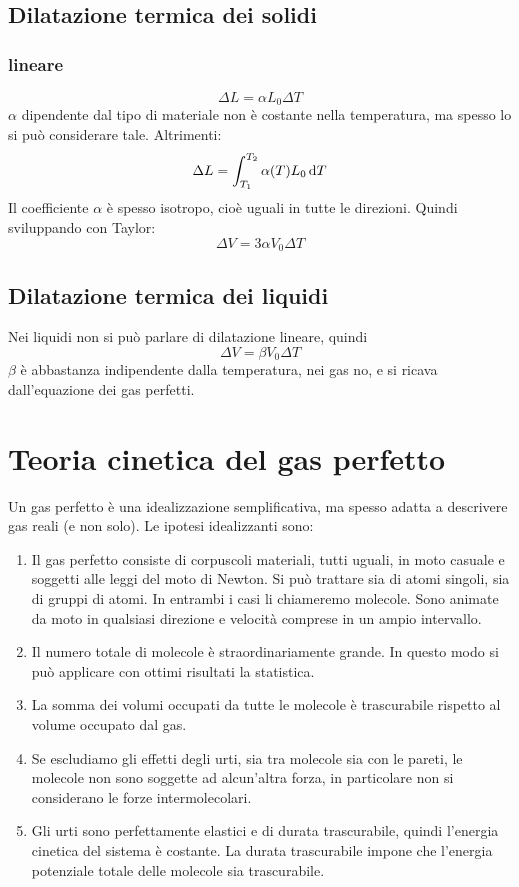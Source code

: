 \subsection{Dilatazione termica dei solidi}
\subsubsection{lineare}
\begin{equation}
\Delta L=\alpha L_0\Delta T
\end{equation}
$\alpha$ dipendente dal tipo di materiale non è costante nella temperatura, ma spesso lo si può considerare tale. Altrimenti:
\begin{equation}
\Delta L=\int_{T_1}^{T_2} \alpha(T) L_0 \,\mathrm{d} T
\end{equation}
Il coefficiente $\alpha$ è spesso isotropo, cioè uguali in tutte le direzioni. Quindi sviluppando con Taylor:
\begin{equation}
\Delta V=3\alpha V_0\Delta T
\end{equation}
\subsection{Dilatazione termica dei liquidi}
Nei liquidi non si può parlare di dilatazione lineare, quindi
\begin{equation}
\Delta V=\beta V_0\Delta T
\end{equation}
$\beta$ è abbastanza indipendente dalla temperatura, nei gas no, e si ricava dall'equazione dei gas perfetti.

\section{Teoria cinetica del gas perfetto}
\label{gas perfetto}
Un gas perfetto è una idealizzazione semplificativa, ma spesso adatta a descrivere gas reali (e non solo). Le ipotesi idealizzanti sono:
\begin{enumerate}
\item Il gas perfetto consiste di corpuscoli materiali, tutti uguali, in moto casuale e soggetti alle leggi del moto di Newton. Si può trattare sia di atomi singoli, sia di gruppi di atomi. In entrambi i casi li chiameremo molecole. Sono animate da moto in qualsiasi direzione e velocità comprese in un ampio intervallo.
\item Il numero totale di molecole è straordinariamente grande. In questo modo si può applicare con ottimi risultati la statistica.
\item La somma dei volumi occupati da tutte le molecole è trascurabile rispetto al volume occupato dal gas.
\item Se escludiamo gli effetti degli urti, sia tra molecole sia con le pareti, le molecole non sono soggette ad alcun'altra forza, in particolare non si considerano le forze intermolecolari.
\item Gli urti sono perfettamente elastici e di durata trascurabile, quindi l'energia cinetica del sistema è costante. La durata trascurabile impone che l'energia potenziale totale delle molecole sia trascurabile.
\end{enumerate}
